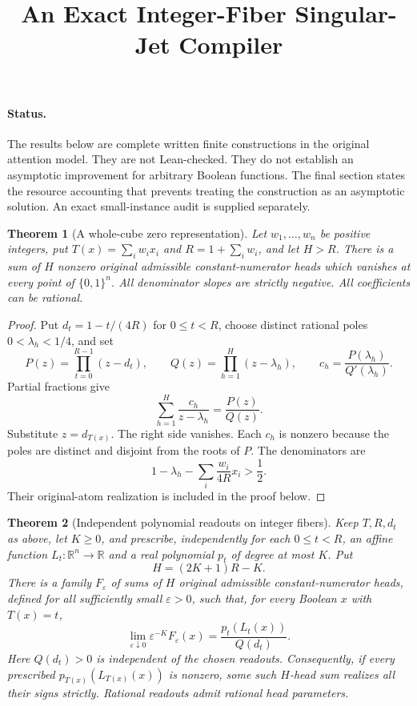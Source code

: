 \documentclass[11pt]{article}
\title{An Exact Integer-Fiber Singular-Jet Compiler}
\author{}
\date{}
\newtheorem{theorem}{Theorem}
\begin{document}
\maketitle

\paragraph{Status.}
The results below are complete written finite constructions in the original
attention model. They are not Lean-checked. They do not establish an
asymptotic improvement for arbitrary Boolean functions. The final section
states the resource accounting that prevents treating the construction as
an asymptotic solution. An exact small-instance audit is supplied separately.

\begin{theorem}[A whole-cube zero representation]
Let $w_1,\ldots,w_n$ be positive integers, put
$T(x)=\sum_i w_i x_i$ and $R=1+\sum_i w_i$, and let $H>R$.
There is a sum of $H$ nonzero original admissible constant-numerator heads
which vanishes at every point of $\{0,1\}^n$. All denominator slopes are
strictly negative. All coefficients can be rational.
\end{theorem}
\begin{proof}
Put $d_t=1-t/(4R)$ for $0\le t<R$, choose distinct rational poles
$0<\lambda_h<1/4$, and set
\[
 P(z)=\prod_{t=0}^{R-1}(z-d_t),\qquad
 Q(z)=\prod_{h=1}^H(z-\lambda_h),\qquad
 c_h=\frac{P(\lambda_h)}{Q'(\lambda_h)}.
\]
Partial fractions give
\[
 \sum_{h=1}^H\frac{c_h}{z-\lambda_h}=\frac{P(z)}{Q(z)}.
 \tag{1}
\]
Substitute $z=d_{T(x)}$. The right side vanishes. Each $c_h$ is
nonzero because the poles are distinct and disjoint from the roots of $P$.
The denominators are
\[
 1-\lambda_h-\sum_i\frac{w_i}{4R}x_i>\frac12.
 \tag{2}
\]
Their original-atom realization is included in the proof below.
\end{proof}

\begin{theorem}[Independent polynomial readouts on integer fibers]
Keep $T,R,d_t$ as above, let $K\ge0$, and prescribe, independently for
each $0\le t<R$, an affine function $L_t:\mathbb R^n\to\mathbb R$
and a real polynomial $p_t$ of degree at most $K$. Put
\[
 H=(2K+1)R-K.
 \tag{3}
\]
There is a family $F_\varepsilon$ of sums of $H$ original admissible
constant-numerator heads, defined for all sufficiently small
$\varepsilon>0$, such that, for every Boolean $x$ with $T(x)=t$,
\[
 \lim_{\varepsilon\downarrow0}\varepsilon^{-K}F_\varepsilon(x)
   =\frac{p_t(L_t(x))}{Q(d_t)}.
 \tag{4}
\]
Here $Q(d_t)>0$ is independent of the chosen readouts. Consequently, if
every prescribed $p_{T(x)}(L_{T(x)}(x))$ is nonzero, some such $H$-head
sum realizes all their signs strictly. Rational readouts admit rational
head parameters.
\end{theorem}
\end{document}
